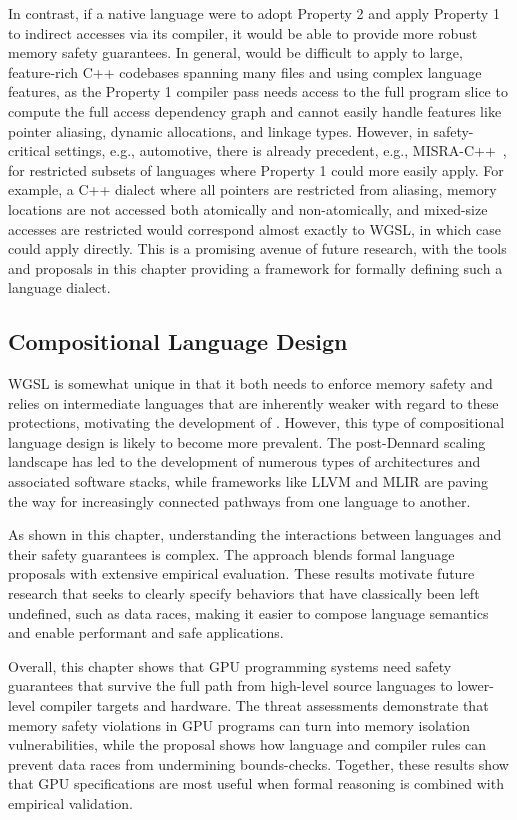 In contrast, if a native language were to adopt \smsg Property 2 and apply \smsg Property 1 to indirect accesses via its compiler, it would be able to provide more robust memory safety guarantees. In general, \smsg would be difficult to apply to large, feature-rich C++ codebases spanning many files and using complex language features, as the Property 1 compiler pass needs access to the full program slice to compute the full access dependency graph and cannot easily handle features like pointer aliasing, dynamic allocations, and linkage types. However, in safety-critical settings, e.g., automotive, there is already precedent, e.g., MISRA-C++~\cite{misracpp}, for restricted subsets of languages where Property 1 could more easily apply. For example, a C++ dialect where all pointers are restricted from aliasing, memory locations are not accessed both atomically and non-atomically, and mixed-size accesses are restricted would correspond almost exactly to WGSL, in which case \smsg could apply directly. This is a promising avenue of future research, with the tools and proposals in this chapter providing a framework for formally defining such a language dialect.

\subsection{Compositional Language Design}

WGSL is somewhat unique in that it both needs to enforce memory safety and relies on intermediate languages that are inherently weaker with regard to these protections, motivating the development of \smsg. However, this type of compositional language design is likely to become more prevalent. The post-Dennard scaling landscape has led to the development of numerous types of architectures and associated software stacks, while frameworks like LLVM and MLIR are paving the way for increasingly connected pathways from one language to another.

As shown in this chapter, understanding the interactions between languages and their safety guarantees is complex. The approach blends formal language proposals with extensive empirical evaluation. These results motivate future research that seeks to clearly specify behaviors that have classically been left undefined, such as data races, making it easier to compose language semantics and enable performant and safe applications.

Overall, this chapter shows that GPU programming systems need safety guarantees that survive the full path from high-level source languages to lower-level compiler targets and hardware. The threat assessments demonstrate that memory safety violations in GPU programs can turn into memory isolation vulnerabilities, while the \smsg proposal shows how language and compiler rules can prevent data races from undermining bounds-checks. Together, these results show that GPU specifications are most useful when formal reasoning is combined with empirical validation.

